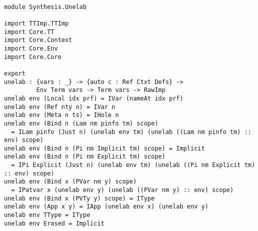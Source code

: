 \documentclass[a4paper]{article}
\begin{document}
\begin{center}
\begin{verbatim}

module Synthesis.Unelab 

import TTImp.TTImp
import Core.TT
import Core.Context
import Core.Env
import Core.Core

export
unelab : {vars : _} -> {auto c : Ref Ctxt Defs} -> 
		 Env Term vars -> Term vars -> RawImp
unelab env (Local idx prf) = IVar (nameAt idx prf)
unelab env (Ref nty n) = IVar n
unelab env (Meta n ts) = IHole n
unelab env (Bind n (Lam nm pinfo tm) scope) 
  = ILam pinfo (Just n) (unelab env tm) (unelab ((Lam nm pinfo tm) :: env) scope)
unelab env (Bind n (Pi nm Implicit tm) scope) = Implicit
unelab env (Bind n (Pi nm Explicit tm) scope)
  = IPi Explicit (Just n) (unelab env tm) (unelab ((Pi nm Explicit tm) :: env) scope)
unelab env (Bind x (PVar nm y) scope) 
  = IPatvar x (unelab env y) (unelab ((PVar nm y) :: env) scope)
unelab env (Bind x (PVTy y) scope) = IType
unelab env (App x y) = IApp (unelab env x) (unelab env y)
unelab env TType = IType
unelab env Erased = Implicit

\end{verbatim}
\end{center}
\clearpage
\end{document}
